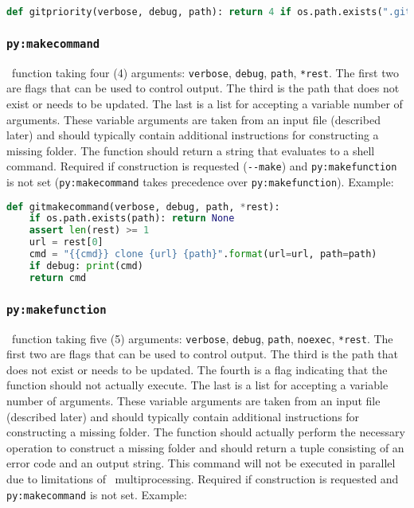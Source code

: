 \begin{snugshade}
\begin{lstlisting}[language=python]
def gitpriority(verbose, debug, path): return 4 if os.path.exists(".git") else 0
\end{lstlisting}
\end{snugshade}

\subsubsection{\lstinline{py:makecommand}}

\Python\ function taking four (4) arguments: \lstinline{verbose}, \lstinline{debug}, \lstinline{path}, \lstinline{*rest}. The first two are flags that can be used to control output. The third is the path that does not exist or needs to be updated. The last is a list for accepting a variable number of arguments. These variable arguments are taken from an input file (described later) and should typically contain additional instructions for constructing a missing folder. The function should return a string that evaluates to a shell command. Required if construction is requested (\lstinline{--make}) and \lstinline{py:makefunction} is not set (\lstinline{py:makecommand} takes precedence over \lstinline{py:makefunction}). Example:

\begin{snugshade}
\begin{lstlisting}[language=python]
def gitmakecommand(verbose, debug, path, *rest):
	if os.path.exists(path): return None
	assert len(rest) >= 1
	url = rest[0]
	cmd = "{{cmd}} clone {url} {path}".format(url=url, path=path)
	if debug: print(cmd)
	return cmd
\end{lstlisting}
\end{snugshade}

\subsubsection{\lstinline{py:makefunction}}

\Python\ function taking five (5) arguments: \lstinline{verbose}, \lstinline{debug}, \lstinline{path}, \lstinline{noexec}, \lstinline{*rest}. The first two are flags that can be used to control output. The third is the path that does not exist or needs to be updated. The fourth is a flag indicating that the function should not actually execute. The last is a list for accepting a variable number of arguments. These variable arguments are taken from an input file (described later) and should typically contain additional instructions for constructing a missing folder. The function should actually perform the necessary operation to construct a missing folder and should return a tuple consisting of an error code and an output string. This command will not be executed in parallel due to limitations of \Python\ multiprocessing. Required if construction is requested and \lstinline{py:makecommand} is not set. Example:

